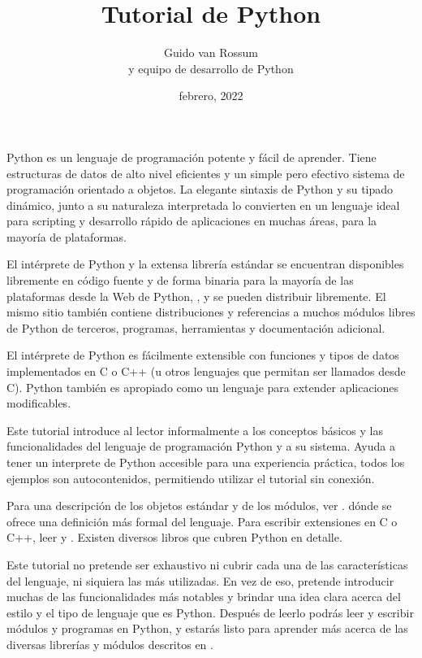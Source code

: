 \documentclass[a5paper,10pt,spanish]{sphinxmanual}
\title{Tutorial de Python}
\date{febrero, 2022}
\author{Guido van Rossum\\y equipo de desarrollo de Python}
\begin{document}
\pagestyle{empty}
\sphinxmaketitle
\pagestyle{plain}
\sphinxtableofcontents
\pagestyle{normal}
\label{\detokenize{tutorial/index::doc}}


\sphinxAtStartPar
Python es un lenguaje de programación potente y fácil de aprender. Tiene estructuras de datos de alto nivel eficientes y un simple pero efectivo sistema de programación orientado a objetos. La elegante sintaxis de Python y su tipado dinámico, junto a su naturaleza interpretada lo convierten en un lenguaje ideal para scripting y desarrollo rápido de aplicaciones en muchas áreas, para la mayoría de plataformas.

\sphinxAtStartPar
El intérprete de Python y la extensa librería estándar se encuentran disponibles libremente en código fuente y de forma binaria para la mayoría de las plataformas desde la Web de Python, , y se pueden distribuir libremente. El mismo sitio también contiene distribuciones y referencias a muchos módulos libres de Python de terceros, programas, herramientas y documentación adicional.

\sphinxAtStartPar
El intérprete de Python es fácilmente extensible con funciones y tipos de datos implementados en C o C++ (u otros lenguajes que permitan ser llamados desde C). Python también es apropiado como un lenguaje para extender aplicaciones modificables.

\sphinxAtStartPar
Este tutorial introduce al lector informalmente a los conceptos básicos y las funcionalidades del lenguaje de programación Python y a su sistema. Ayuda a tener un interprete de Python accesible para una experiencia práctica, todos los ejemplos son auto\sphinxhyphen{}contenidos, permitiendo utilizar el tutorial sin conexión.

\sphinxAtStartPar
Para una descripción de los objetos estándar y de los módulos, ver .  dónde se ofrece una definición más formal del lenguaje. Para escribir extensiones en C o C++, leer  y . Existen diversos libros que cubren Python en detalle.

\sphinxAtStartPar
Este tutorial no pretende ser exhaustivo ni cubrir cada una de las características del lenguaje, ni siquiera las más utilizadas. En vez de eso, pretende introducir muchas de las funcionalidades más notables y brindar una idea clara acerca del estilo y el tipo de lenguaje que es Python. Después de leerlo podrás leer y escribir módulos y programas en Python, y estarás listo para aprender más acerca de las diversas librerías y módulos descritos en .
\end{document}
